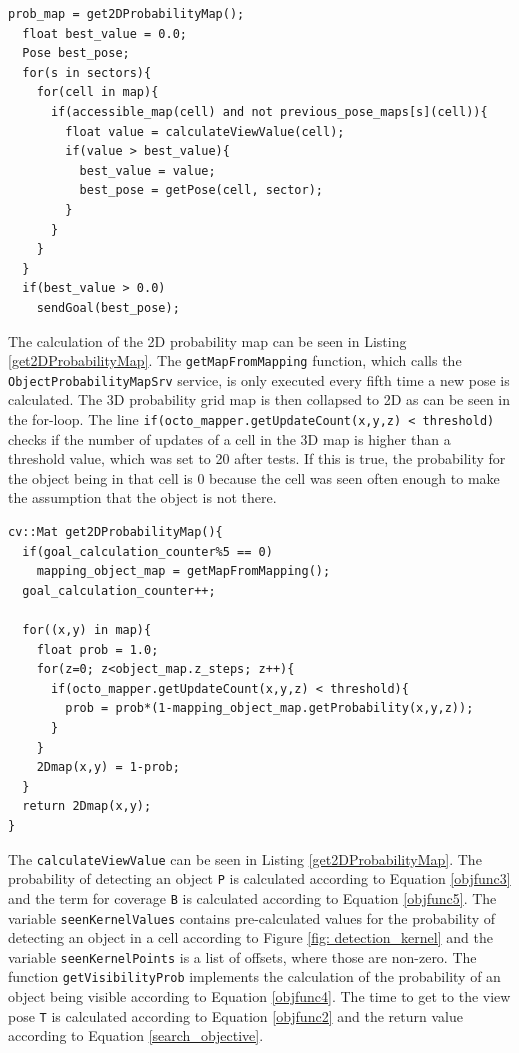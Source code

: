 \begin{minipage}{\linewidth}
\begin{lstlisting}[caption=Calculation of the next pose,frame=single, label=Searchercalc]
  prob_map = get2DProbabilityMap();
  float best_value = 0.0;
  Pose best_pose;
  for(s in sectors){
    for(cell in map){
      if(accessible_map(cell) and not previous_pose_maps[s](cell)){
        float value = calculateViewValue(cell);
        if(value > best_value){
          best_value = value;
          best_pose = getPose(cell, sector);
        }        
      }
    }
  }
  if(best_value > 0.0)
    sendGoal(best_pose);
\end{lstlisting}
\end{minipage}

The calculation of the 2D probability map can be seen in Listing \ref{get2DProbabilityMap}. The \texttt{getMapFromMapping} function, which calls the \texttt{ObjectProbabilityMapSrv} service, is only executed every fifth time a new pose is calculated. The 3D probability grid map is then collapsed to 2D as can be seen in the for-loop. The line \texttt{if(octo{\_}mapper.getUpdateCount(x,y,z) < threshold)} checks if the number of updates of a cell in the 3D map is higher than a threshold value, which was set to 20 after tests. If this is true, the probability for the object being in that cell is 0 because the cell was seen often enough to make the assumption that the object is not there.

\begin{minipage}{\linewidth}
\begin{lstlisting}[caption=get2DProbabilityMap(),frame=single, label=get2DProbabilityMap]
cv::Mat get2DProbabilityMap(){
  if(goal_calculation_counter%5 == 0)
    mapping_object_map = getMapFromMapping();
  goal_calculation_counter++;
  
  for((x,y) in map){
    float prob = 1.0;
    for(z=0; z<object_map.z_steps; z++){
      if(octo_mapper.getUpdateCount(x,y,z) < threshold){
        prob = prob*(1-mapping_object_map.getProbability(x,y,z));
      }
    }
    2Dmap(x,y) = 1-prob;
  }
  return 2Dmap(x,y);
}
\end{lstlisting}
\end{minipage}

The \texttt{calculateViewValue} can be seen in Listing \ref{get2DProbabilityMap}. The probability of detecting an object \texttt{P} is calculated according to Equation \ref{objfunc3} and the term for coverage \texttt{B} is calculated according to Equation \ref{objfunc5}. The variable \texttt{seenKernelValues} contains pre-calculated values for the probability of detecting an object in a cell according to Figure \ref{fig: detection_kernel} and the variable \texttt{seenKernelPoints} is a list of offsets, where those are non-zero. The function \texttt{getVisibilityProb} implements the calculation of the  probability of an object being visible according to Equation \ref{objfunc4}. The time to get to the view pose \texttt{T} is calculated according to Equation \ref{objfunc2} and the return value according to Equation \ref{search_objective}.

